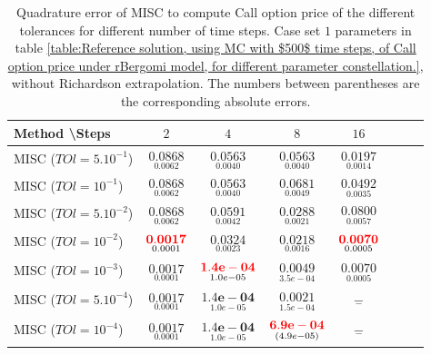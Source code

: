 \documentclass[11pt]{article}
\begin{document}
\begin{table}[h!]
	\centering
	\begin{tabular}{l*{6}{c}r}
		Method \textbackslash  Steps            & $2$ & $4$ & $8$ & $16$  \\
		\hline
		MISC ($TOl=5.10^{-1}$)  & $\underset{0.0062}{\mathbf{  0.0868}}$ & $\underset{ 0.0040}{\mathbf{0.0563}}$ & $\underset{ 0.0040}{\mathbf{0.0563}}$ & $\underset{0.0014}{\mathbf{0.0197}}$  \\
		MISC ($TOl=10^{-1}$)  & $\underset{0.0062}{\mathbf{  0.0868}}$ & $\underset{ 0.0040}{\mathbf{0.0563}}$& $\underset{0.0049}{\mathbf{0.0681}}$ & $\underset{0.0035
		}{\mathbf{0.0492}}$  \\
		MISC ($TOl=5.10^{-2}$)  &$\underset{0.0062}{\mathbf{  0.0868}}$ & $\underset{0.0042}{\mathbf{0.0591}}$ & $\underset{0.0021}{\mathbf{0.0288
		}}$ & $\underset{0.0057}{\mathbf{0.0800}}$  \\
		MISC ($TOl=10^{-2}$)  & $\underset{ 0.0001
		}{\mathbf{{\color{red}  0.0017}}}$ & $\underset{ 0.0023}{\mathbf{ 0.0324}}$ & $\underset{0.0016
		}{\mathbf{0.0218
		}}$ & $\underset{0.0005}{\mathbf{{\color{red}0.0070}}}$  \\
		MISC ($TOl=10^{-3}$)  & $\underset{ 0.0001
		}{\mathbf{  0.0017}}$ & $\underset{1.0e-05
	}{\mathbf{ {\color{red}1.4e-04
	}}}$ & $\underset{3.5e-04
		}{\mathbf{  0.0049
		}}$ & $\underset{0.0005}{\mathbf{ 0.0070}}$  \\
	MISC ($TOl=5.10^{-4}$)  & $\underset{ 0.0001
	}{\mathbf{  0.0017}}$ & $\underset{1.0e-05
	}{\mathbf{ 1.4e-04
	}}$ & $\underset{1.5e-04
	}{\mathbf{    0.0021
	}}$ & $\underset{-}{\mathbf{-}}$  \\
		MISC ($TOl=10^{-4}$)  & $\underset{ 0.0001
		}{\mathbf{  0.0017}}$ & $\underset{1.0e-05
	}{\mathbf{ 1.4e-04
}}$ & $\underset{(  4.9e-05)
		}{\mathbf{{\color{red}6.9e-04}
		}}$ & $\underset{-}{\mathbf{-}}$  \\
		\hline
	\end{tabular}
	\caption{Quadrature error of MISC to compute Call option price of the different tolerances for different number of time steps. Case  set $1$ parameters in table \ref{table:Reference solution, using MC with $500$ time steps, of Call option price under rBergomi model, for different parameter constellation.}, without Richardson extrapolation. The numbers between parentheses are the corresponding absolute errors.}
	\label{Quadrature error of MISC to compute Call option price of the different tolerances for different number of time steps. Case  set $1$ parameters, without Richardson extrapolation. The numbers between parentheses are the corresponding absolute errors.}
\end{table}
\end{document}
